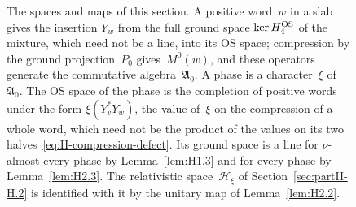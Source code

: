 \begin{figure}[t]
\centering
{}
\caption{The spaces and maps of this section. A positive word~$w$ in a slab gives the insertion $Y_w$ from the full ground space $\ker H_4^{\rm OS}$ of the mixture, which need not be a line, into its OS space; compression by the ground projection~$P_0$ gives~$M^0(w)$, and these operators generate the commutative algebra~$\mathfrak A_0$. A phase is a character~$\xi$ of~$\mathfrak A_0$. The OS space of the phase is the completion of positive words under the form $\xi(Y_v^*Y_w)$, the value of~$\xi$ on the compression of a whole word, which need not be the product of the values on its two halves~\eqref{eq:H-compression-defect}. Its ground space is a line for $\nu$-almost every phase by Lemma~\ref{lem:H1.3} and for every phase by Lemma~\ref{lem:H2.3}. The relativistic space~$\mathcal H_\xi$ of Section~\ref{sec:partII-H.2} is identified with it by the unitary map of Lemma~\ref{lem:H2.2}.}
\label{fig:H-spaces}
\end{figure}

